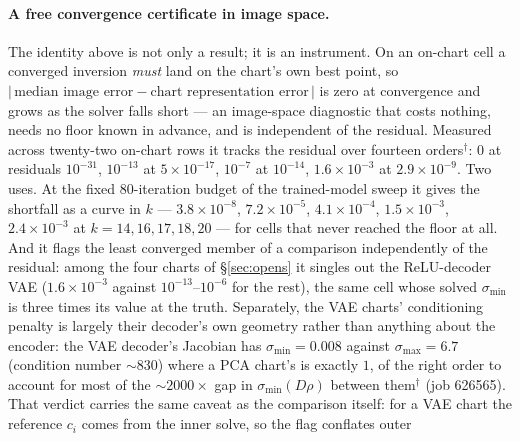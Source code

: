 \paragraph{A free convergence certificate in image space.} The identity above
is not only a result; it is an instrument. On an on-chart cell a converged
inversion \emph{must} land on the chart's own best point, so
$\bigl|\,\text{median image error}-\text{chart representation error}\,\bigr|$
is zero at convergence and grows as the solver falls short — an image-space
diagnostic that costs nothing, needs no floor known in advance, and is
independent of the residual. Measured across twenty-two on-chart rows it
tracks the residual over fourteen orders$^\dagger$: $0$ at residuals
$10^{-31}$, $10^{-13}$ at $5\times10^{-17}$, $10^{-7}$ at $10^{-14}$,
$1.6\times10^{-3}$ at $2.9\times10^{-9}$. Two uses. At the fixed $80$-iteration
budget of the trained-model sweep it gives the shortfall as a curve in $k$ —
$3.8\times10^{-8}$, $7.2\times10^{-5}$, $4.1\times10^{-4}$,
$1.5\times10^{-3}$, $2.4\times10^{-3}$ at $k=14,16,17,18,20$ — for cells that
never reached the floor at all. And it flags the least converged member of a
comparison independently of the residual: among the four charts of
\S\ref{sec:opens} it singles out the ReLU-decoder VAE ($1.6\times10^{-3}$
against $10^{-13}$--$10^{-6}$ for the rest), the same cell whose
solved $\sigma_{\min}$ is three times its value at the truth. Separately,
the VAE charts' conditioning penalty is largely their decoder's own geometry
rather than anything about the encoder: the VAE decoder's Jacobian has
$\sigma_{\min}=0.008$ against $\sigma_{\max}=6.7$ (condition number
${\sim}830$) where a PCA chart's is exactly $1$, of the right order to
account for most of the ${\sim}2000\times$ gap in $\sigma_{\min}(D\rho)$
between them$^\dagger$ (job 626565). That verdict
carries the same caveat as the comparison itself: for a VAE chart the
reference $c_i$ comes from the inner solve, so the flag conflates outer
